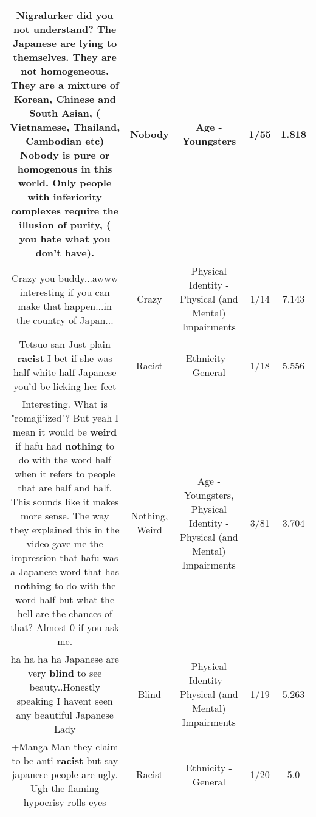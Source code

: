 \documentclass[11pt]{article}
\newlength\mylength
\begin{document}
\begin{center}
\begin{longtable}{|C{.65\mylength}|C{.30\mylength}|C{.12\mylength}|C{.12\mylength}|C{.12\mylength}|}
  \small Nigralurker did you not understand? The Japanese are lying to themselves. They are not homogeneous. They are a mixture of Korean, Chinese and South Asian, ( Vietnamese, Thailand, Cambodian etc) \textbf{Nobody} is pure or homogenous in this world. Only  people with inferiority complexes require the illusion of purity, ( you hate what you don't have).\normalsize   & Nobody & Age - Youngsters & 1/55 & 1.818 \\  \hline
  \small Crazy you buddy...awww interesting if you can make that happen...in the country of Japan...\normalsize   & Crazy & Physical Identity - Physical (and Mental) Impairments & 1/14 & 7.143 \\  \hline
  \small Tetsuo-san Just plain \textbf{racist} I bet if she was half white half Japanese you'd be licking her feet\normalsize   & Racist & Ethnicity - General & 1/18 & 5.556 \\  \hline
  \small Interesting. What is "romaji'ized"? But yeah I mean it would be \textbf{weird} if hafu had \textbf{nothing} to do with the word half when it refers to people that are half and half. This sounds like it makes more sense. The way they explained this in the video gave me the impression that hafu was a Japanese word that has \textbf{nothing} to do with the word half but what the hell are the chances of that? Almost 0 if you ask me.\normalsize   & Nothing, Weird & Age - Youngsters, Physical Identity - Physical (and Mental) Impairments & 3/81 & 3.704 \\  \hline
  \small ha ha ha ha Japanese are very \textbf{blind} to see beauty..Honestly speaking I havent seen any beautiful Japanese Lady\normalsize   & Blind & Physical Identity - Physical (and Mental) Impairments & 1/19 & 5.263 \\  \hline
  \small +Manga Man they claim to be anti \textbf{racist} but say japanese people are ugly. Ugh the flaming hypocrisy rolls eyes\normalsize   & Racist & Ethnicity - General & 1/20 & 5.0 \\  \hline

\end{longtable}
\end{center}
\end{document}
